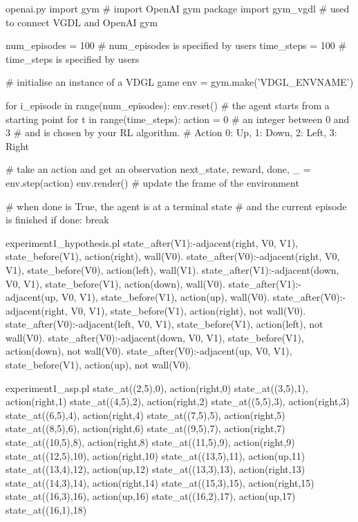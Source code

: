 \begin{filecontents*}{openai.py}
  import gym # import OpenAI gym package
  import gym_vgdl # used to connect VGDL and OpenAI gym

  num_episodes = 100 # num_episodes is specified by users
  time_steps = 100 # time_steps is specified by users

  # initialise an instance of a VDGL game
  env = gym.make('VDGL_ENVNAME')

  for i_episode in range(num_episodes): 
      env.reset()  # the agent starts from a starting point
      for t in range(time_steps): 
          action = 0 # an integer between 0 and 3
                     # and is chosen by your RL algorithm.
                     # Action 0: Up, 1: Down, 2: Left, 3: Right

          # take an action and get an observation
          next_state, reward, done, _ = env.step(action)
          env.render() # update the frame of the environment

          # when done is True, the agent is at a terminal state
          # and the current episode is finished
          if done:
              break
\end{filecontents*}
  

\begin{filecontents*}{experiment1_hypothesis.pl}
state_after(V1):-adjacent(right, V0, V1), state_before(V1), 
                   action(right), wall(V0).
state_after(V0):-adjacent(right, V0, V1), state_before(V0), 
                   action(left), wall(V1).
state_after(V1):-adjacent(down, V0, V1), state_before(V1), 
                   action(down), wall(V0).
state_after(V1):-adjacent(up, V0, V1), state_before(V1), 
                   action(up), wall(V0).
state_after(V0):-adjacent(right, V0, V1), state_before(V1), 
                   action(right), not wall(V0).
state_after(V0):-adjacent(left, V0, V1), state_before(V1), 
                   action(left), not wall(V0).
state_after(V0):-adjacent(down, V0, V1), state_before(V1), 
                   action(down), not wall(V0).
state_after(V0):-adjacent(up, V0, V1), state_before(V1), 
                   action(up), not wall(V0).
\end{filecontents*}

\begin{filecontents*}{experiment1_asp.pl}
state_at((2,5),0), action(right,0)
state_at((3,5),1), action(right,1)
state_at((4,5),2), action(right,2)
state_at((5,5),3), action(right,3)
state_at((6,5),4), action(right,4)
state_at((7,5),5), action(right,5)
state_at((8,5),6), action(right,6)
state_at((9,5),7), action(right,7)
state_at((10,5),8), action(right,8)
state_at((11,5),9), action(right,9)
state_at((12,5),10), action(right,10)
state_at((13,5),11), action(up,11)
state_at((13,4),12), action(up,12)
state_at((13,3),13), action(right,13)
state_at((14,3),14), action(right,14)
state_at((15,3),15), action(right,15)
state_at((16,3),16), action(up,16)
state_at((16,2),17), action(up,17)
state_at((16,1),18)
\end{filecontents*}

